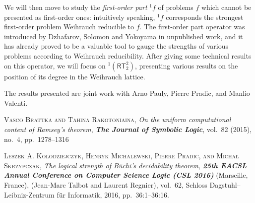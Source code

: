 \documentclass[bsl,meeting]{asl}
\newcommand{\rt}{\mathsf{RT}}
\newcommand{\leqW}{\leq_\mathrm{W}}
\newcommand{\equivW}{\equiv_\mathrm{W}}
\newcommand{\fop}[1]{{}^1{#1}}
\begin{document}
We will then move to study the \emph{first-order part} $\fop{f}$ of problems $f$ which cannot be presented as first-order ones: intuitively speaking, $\fop{f}$ corresponds the strongest first-order problem Weihrauch reducible to $f$. The first-order part operator was introduced by Dzhafarov, Solomon and Yokoyama in unpublished work, and it has already proved to be a valuable tool to gauge the strengths of various problems according to Weihrauch reducibility. After giving some technical results on this operator, we will focus on $\fop{(\rt^2_2)}$, presenting various results on the position of its degree in the Weihrauch lattice.








The results presented are joint work with Arno Pauly, Pierre Pradic, and Manlio Valenti.

\begin{thebibliography}{1}

  {\scshape Vasco Brattka and Tahina Rakotoniaina},
  {\itshape On the uniform computational content of Ramsey's theorem},
  {\bfseries\itshape The Journal of Symbolic Logic},
  vol.~82 (2015), no.~4, pp.~1278--1316

  {\scshape Leszek A. Kolodziejczyk, Henryk Michalewski, Pierre Pradic, and Michał
    Skrzypczak},
  {\itshape  The logical strength of Büchi’s decidability theorem},
  {\bfseries\itshape 25th EACSL Annual Conference on Computer Science Logic (CSL 2016)}
  (Marseille, France),
  (Jean-Marc Talbot and Laurent Regnier),
  vol.~62,
  Schloss Dagstuhl--Leibniz-Zentrum für Informatik,
  2016,
  pp.~36:1--36:16.

\end{thebibliography}

\vspace*{-0.5\baselineskip}
\end{document}
